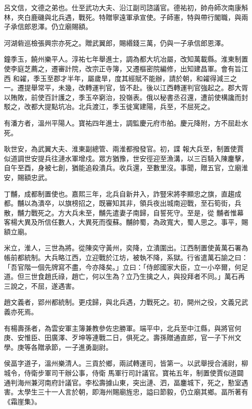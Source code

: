 \begin{pinyinscope}
 呂文信，文德之弟也。仕至武功大夫、沿江副司諮議官。德祐初，帥舟師次南康斛林，夾白鹿磯與北兵遇，戰死。特贈寧遠軍承宣使。子師憲，特與帶行閣職，與兩子承信郎恩澤。仍立廟賜額。



 河湖砦巡檢張興宗亦死之。贈武翼郎，賜緡錢三萬，仍與一子承信郎恩澤。



 鐘季玉，饒州樂平人。淳祐七年舉進士，調為都大坑冶屬，改知萬載縣。淮東制置使李庭芝薦之，遷審計院，改宗正寺簿，又遷樞密院編修，出知建昌軍。會有旨江西
 和糴，季玉至郡才半年，屬歲旱，度其經賦不能辦，請於朝，和糴得減三之一。遷提舉常平，未幾，改轉運判官，皆不赴。後以江西轉運判官強起之。郡大胥以賄敗，前使百計護之，季玉卒窮治，投嶺表。俄以秘書丞召還，遭前使構讒而封駁之，改都大提點坑冶。北兵渡江，季玉徙寓建陽，兵至，不屈死之。



 有潘方者，溫州平陽人。寶祐四年進士，調監慶元府市舶。慶元降附，方不屈赴水死。



 耿世安，為武翼大夫、淮東副總管、兩淮都撥發官。初，諜
 報大兵至，制置使賈似道調世安提兵往漣水軍增戍。眾方猶豫，世安徑迎至漁溝，以三百騎入陳鏖擊，自午至酉，身被七創，猶能追殺潰兵。收兵還，至數里沒。事聞，贈五官，立廟淮安，賜額忠武。



 丁黼，成都制置使也。嘉熙三年，北兵自新井入，詐豎宋將李顯忠之旗，直趨成都。黼以為潰卒，以旗榜招之，既審知其非，領兵夜出城南迎戰，至石筍街，兵散，黼力戰死之。方大兵未至，黼先遣妻子南歸，自誓死守。至是，從
 黼者惟幕客楊大異及所信任數人，大異死而復蘇。黼帥蜀，為政寬大，蜀人思之。事平，賜額立廟。



 米立，淮人，三世為將。從陳奕守黃州，奕降，立潰圍出。江西制置使黃萬石署為帳前都統制。大兵略江西，立迎戰於江坊，被執不降，系獄。行省遣萬石諭之曰：「吾官階一個先牌寫不盡，今亦降矣。」立曰：「侍郎國家大臣，立一小卒爾，何足道。但三世食趙氏祿，趙亡，何以生為？立乃生擒之人，與投拜者不同。」萬石再三說之，不屈，遂遇害。



 趙文義者，郢州都統制。更戍歸，與北兵遇，力戰死之。初，開州之役，文義兄武義亦死焉。



 有楊壽孫者，為雲安軍主簿兼教參佐忠勝軍。端平中，北兵至中江縣，與將官何庚、安惟臣、田廣澤、歹坤等連戰二日，俱死之。壽孫贈通直郎，官一子下州文學。庚等各贈承節，一子進勇副尉。



 侯畐字道子，溫州樂清人。三貢於鄉，兩試轉運司，皆第一。以武舉授合浦尉，柳城令，侍衛步軍司干辦公事，侍衛
 馬軍行司計議官。寶祐五年，制置使賈似道闢通判海州兼河南府計議官。李松壽據山東，突出漣、泗，畐鏖城下，死之，懃室遇害。太學生三十一人言於朝，即海州賜廟旌忠，謚曰節毅，仍立廟其鄉。畐所著有《霜崖集》。




\end{pinyinscope}
